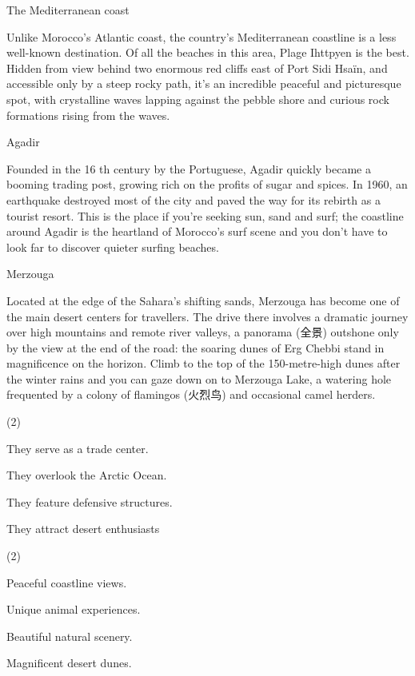 \documentclass{英语试卷}
\begin{document}
\par The Mediterranean coast\par
\par Unlike Morocco's Atlantic coast, the country's Mediterranean coastline is a less well-known destination. Of all the beaches in this area, Plage Ihttpyen is the best. Hidden from view behind two enormous red cliffs east of Port Sidi Hsaïn, and accessible only by a steep rocky path, it's an incredible peaceful and picturesque spot, with crystalline waves lapping against the pebble shore and curious rock formations rising from the waves.\par
\par Agadir\par
\par Founded in the 16 th century by the Portuguese, Agadir quickly became a booming trading post, growing rich on the profits of sugar and spices. In 1960, an earthquake destroyed most of the city and paved the way for its rebirth as a tourist resort. This is the place if you're seeking sun, sand and surf; the coastline around Agadir is the heartland of Morocco's surf scene and you don't have to look far to discover quieter surfing beaches.\par
\par Merzouga\par
\par Located at the edge of the Sahara's shifting sands, Merzouga has become one of the main desert centers for travellers. The drive there involves a dramatic journey over high mountains and remote river valleys, a panorama (全景) outshone only by the view at the end of the road: the soaring dunes of Erg Chebbi stand in magnificence on the horizon. Climb to the top of the 150-metre-high dunes after the winter rains and you can gaze down on to Merzouga Lake, a watering hole frequented by a colony of flamingos (火烈鸟) and occasional camel herders.\par
{}
\begin{choices}(2)
  \item They serve as a trade center.
  \item They overlook the Arctic Ocean.
  \item They feature defensive structures.
  \item They attract desert enthusiasts
\end{choices}
\begin{choices}(2)
  \item Peaceful coastline views.
  \item Unique animal experiences.
  \item Beautiful natural scenery.
  \item Magnificent desert dunes.
\end{choices}
\end{document}

